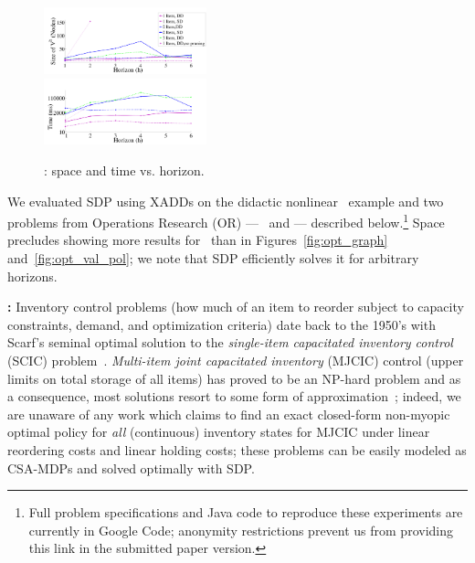 \begin{figure}[tbp!]
\vspace{-5mm}
\centering
\includegraphics[width=0.42\textwidth]{new_pics/space1.pdf}\\
\vspace{-2mm}
\includegraphics[width=0.42\textwidth]{new_pics/time1.pdf}
\vspace{-2mm}
\caption{\footnotesize \InventoryControl: space 
and time vs. horizon.
}
\label{fig:invC}
\vspace{-3mm}
\end{figure}

\label{sec:results}
 
We evaluated SDP using XADDs on the didactic nonlinear
\MarsRover\ example and two problems from Operations Research (OR) --- 
\InventoryControl\ and \WaterReservoir --- described below.\footnote{
Full problem specifications and Java code to
reproduce these experiments are currently 
in Google Code; anonymity restrictions 
prevent us from providing this link in the submitted paper version.}
Space precludes showing 
more results for \MarsRover\ than in Figures~\ref{fig:opt_graph}
and~\ref{fig:opt_val_pol}; we note that SDP efficiently solves it
for arbitrary horizons.

{\bf \InventoryControl:} Inventory control problems (how much of an
item to reorder subject to capacity constraints, demand, and 
optimization criteria) date back to the 1950's with
Scarf's seminal optimal solution to the \emph{single-item capacitated
inventory control} (SCIC) problem~\cite{Scarf_Karlin58}.
\emph{Multi-item joint capacitated inventory} (MJCIC) control (upper limits
on total storage of all items) has proved to be an NP-hard problem and
as a consequence, most solutions resort to some form of
approximation~\cite{bitran,wusd10}; indeed, we are unaware of any 
work which claims to find an exact closed-form non-myopic
optimal policy for \emph{all} (continuous) inventory states for MJCIC 
under linear reordering costs and linear holding costs; these 
problems can be easily modeled as CSA-MDPs and solved optimally
with SDP.  

